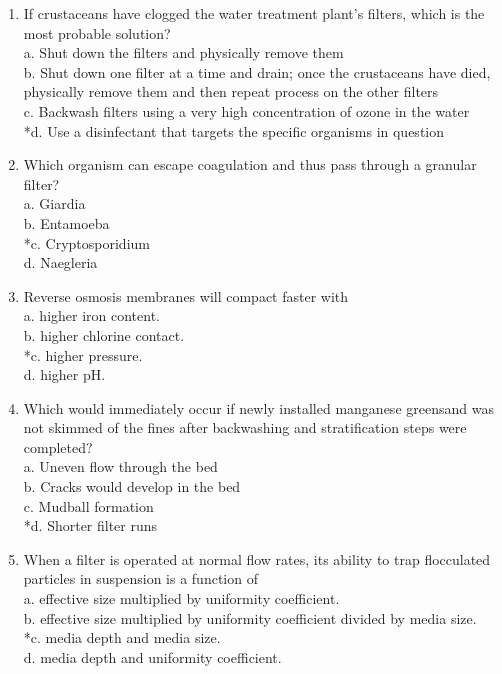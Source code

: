 \begin{enumerate}
  \item If crustaceans have clogged the water treatment plant's filters, which is the most probable solution?\\
a. Shut down the filters and physically remove them\\
b. Shut down one filter at a time and drain; once the crustaceans have died, physically remove them and then repeat process on the other filters\\
c. Backwash filters using a very high concentration of ozone in the water\\
*d. Use a disinfectant that targets the specific organisms in question\\
  \item Which organism can escape coagulation and thus pass through a granular filter?\\
a. Giardia\\
b. Entamoeba\\
*c. Cryptosporidium\\
d. Naegleria\\
  \item Reverse osmosis membranes will compact faster with\\
a. higher iron content.\\
b. higher chlorine contact.\\
*c. higher pressure.\\
d. higher pH.\\
  \item Which would immediately occur if newly installed manganese greensand was not skimmed of the fines after backwashing and stratification steps were completed?\\
a. Uneven flow through the bed\\
b. Cracks would develop in the bed\\
c. Mudball formation\\
*d. Shorter filter runs \\
\item When a filter is operated at normal flow rates, its ability to trap flocculated particles in suspension is a function of\\
a. effective size multiplied by uniformity coefficient.\\
b. effective size multiplied by uniformity coefficient divided by media size.\\
*c. media depth and media size.\\
d. media depth and uniformity coefficient.\\


\end{enumerate}
